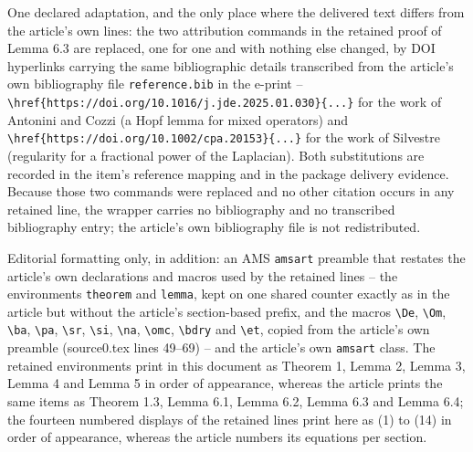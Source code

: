 \documentclass[10pt,a4paper]{amsart}
\begin{document}
One declared adaptation, and the only place where the delivered text differs from the article's own lines: the two attribution commands in the retained proof of Lemma 6.3 are replaced, one for one and with nothing else changed, by DOI hyperlinks carrying the same bibliographic details transcribed from the article's own bibliography file \texttt{reference.bib} in the e-print -- \texttt{\textbackslash href\{https://doi.org/10.1016/j.jde.2025.01.030\}\{...\}} for the work of Antonini and Cozzi (a Hopf lemma for mixed operators) and \texttt{\textbackslash href\{https://doi.org/10.1002/cpa.20153\}\{...\}} for the work of Silvestre (regularity for a fractional power of the Laplacian). Both substitutions are recorded in the item's reference mapping and in the package delivery evidence. Because those two commands were replaced and no other citation occurs in any retained line, the wrapper carries no bibliography and no transcribed bibliography entry; the article's own bibliography file is not redistributed.

Editorial formatting only, in addition: an AMS \texttt{amsart} preamble that restates the article's own declarations and macros used by the retained lines -- the environments \texttt{theorem} and \texttt{lemma}, kept on one shared counter exactly as in the article but without the article's section-based prefix, and the macros \texttt{\textbackslash De}, \texttt{\textbackslash Om}, \texttt{\textbackslash ba}, \texttt{\textbackslash pa}, \texttt{\textbackslash sr}, \texttt{\textbackslash si}, \texttt{\textbackslash na}, \texttt{\textbackslash omc}, \texttt{\textbackslash bdry} and \texttt{\textbackslash et}, copied from the article's own preamble (source0.tex lines 49--69) -- and the article's own \texttt{amsart} class. The retained environments print in this document as Theorem 1, Lemma 2, Lemma 3, Lemma 4 and Lemma 5 in order of appearance, whereas the article prints the same items as Theorem 1.3, Lemma 6.1, Lemma 6.2, Lemma 6.3 and Lemma 6.4; the fourteen numbered displays of the retained lines print here as (1) to (14) in order of appearance, whereas the article numbers its equations per section.
\end{document}
